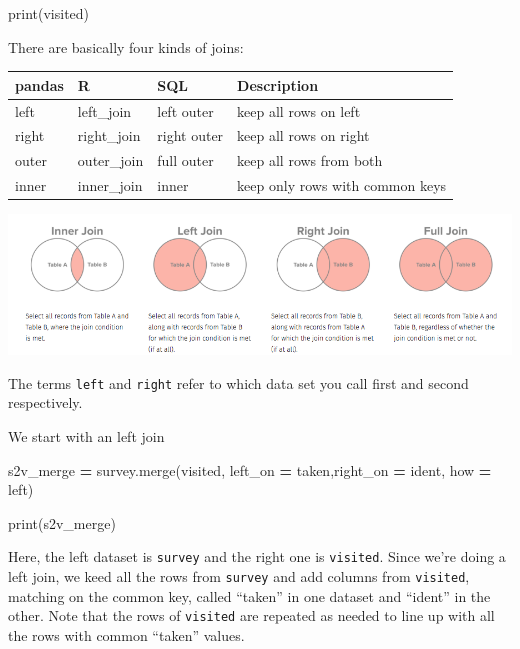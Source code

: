 \documentclass[
  letterpaper,
]{scrbook}
\newenvironment{Shaded}{\begin{snugshade}}{\end{snugshade}}
\newcommand{\BuiltInTok}[1]{#1}
\newcommand{\NormalTok}[1]{#1}
\newcommand{\OperatorTok}[1]{\textcolor[rgb]{0.81,0.36,0.00}{\textbf{#1}}}
\newcommand{\StringTok}[1]{\textcolor[rgb]{0.31,0.60,0.02}{#1}}
\begin{document}
\begin{Shaded}
\begin{Highlighting}[]
\BuiltInTok{print}\NormalTok{(visited)}
\end{Highlighting}
\end{Shaded}

There are basically four kinds of joins:

\begin{longtable}[]{@{}llll@{}}
\toprule
pandas & R & SQL & Description\tabularnewline
\midrule
\endhead
left & left\_join & left outer & keep all rows on left\tabularnewline
right & right\_join & right outer & keep all rows on right\tabularnewline
outer & outer\_join & full outer & keep all rows from both\tabularnewline
inner & inner\_join & inner & keep only rows with common keys\tabularnewline
\bottomrule
\end{longtable}

\includegraphics{graphs/joins.png}

The terms \texttt{left} and \texttt{right} refer to which data set you call first and second respectively.

We start with an left join

\begin{Shaded}
\begin{Highlighting}[]
\NormalTok{s2v\_merge }\OperatorTok{=}\NormalTok{ survey.merge(visited, left\_on }\OperatorTok{=} \StringTok{\textquotesingle{}taken\textquotesingle{}}\NormalTok{,right\_on }\OperatorTok{=} \StringTok{\textquotesingle{}ident\textquotesingle{}}\NormalTok{, how }\OperatorTok{=} \StringTok{\textquotesingle{}left\textquotesingle{}}\NormalTok{)}
\end{Highlighting}
\end{Shaded}

\begin{Shaded}
\begin{Highlighting}[]
\BuiltInTok{print}\NormalTok{(s2v\_merge)}
\end{Highlighting}
\end{Shaded}

Here, the left dataset is \texttt{survey} and the right one is \texttt{visited}. Since we're doing a left join, we keed all the rows from \texttt{survey} and add columns from \texttt{visited}, matching on the common key, called ``taken'' in one dataset and ``ident'' in the other. Note that the rows of \texttt{visited} are repeated as needed to line up with all the rows with common ``taken'' values.
\end{document}
